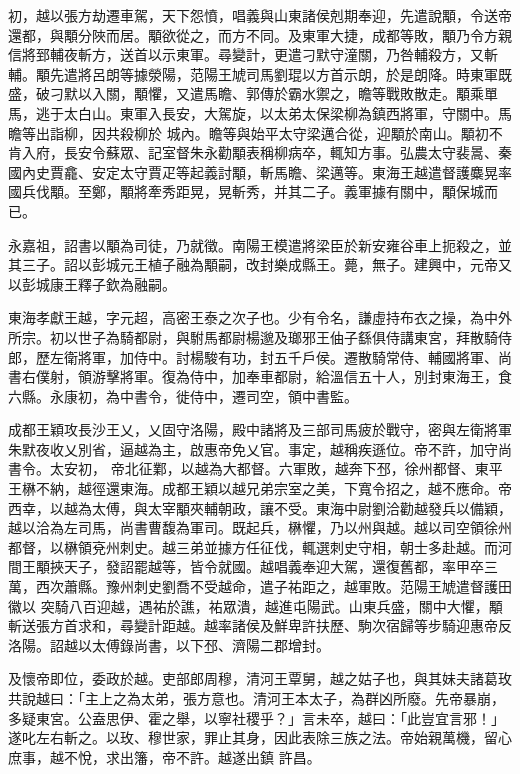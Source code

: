 \begin{pinyinscope}
 初，越以張方劫遷車駕，天下怨憤，唱義與山東諸侯剋期奉迎，先遣說顒，令送帝還都，與顒分陜而居。顒欲從之，而方不同。及東軍大捷，成都等敗，顒乃令方親信將郅輔夜斬方，送首以示東軍。尋變計，更遣刁默守潼關，乃咎輔殺方，又斬輔。顒先遣將呂朗等據滎陽，范陽王虓司馬劉琨以方首示朗，於是朗降。時東軍既盛，破刁默以入關，顒懼，又遣馬瞻、郭傳於霸水禦之，瞻等戰敗散走。顒乘單馬，逃于太白山。東軍入長安，大駕旋，以太弟太保梁柳為鎮西將軍，守關中。馬瞻等出詣柳，因共殺柳於
 城內。瞻等與始平太守梁邁合從，迎顒於南山。顒初不肯入府，長安令蘇眾、記室督朱永勸顒表稱柳病卒，輒知方事。弘農太守裴暠、秦國內史賈龕、安定太守賈疋等起義討顒，斬馬瞻、梁邁等。東海王越遣督護麋晃率國兵伐顒。至鄭，顒將牽秀距晃，晃斬秀，并其二子。義軍據有關中，顒保城而已。



 永嘉祖，詔書以顒為司徒，乃就徵。南陽王模遣將梁臣於新安雍谷車上扼殺之，並其三子。詔以彭城元王植子融為顒嗣，改封樂成縣王。薨，無子。建興中，元帝又以彭城康王釋子欽為融嗣。



 東海孝獻王越，字元超，高密王泰之次子也。少有令名，謙虛持布衣之操，為中外所宗。初以世子為騎都尉，與駙馬都尉楊邈及瑯邪王伷子繇俱侍講東宮，拜散騎侍郎，歷左衛將軍，加侍中。討楊駿有功，封五千戶侯。遷散騎常侍、輔國將軍、尚書右僕射，領游擊將軍。復為侍中，加奉車都尉，給溫信五十人，別封東海王，食六縣。永康初，為中書令，徙侍中，遷司空，領中書監。



 成都王穎攻長沙王乂，乂固守洛陽，殿中諸將及三部司馬疲於戰守，密與左衛將軍朱默夜收乂別省，逼越為主，啟惠帝免乂官。事定，越稱疾遜位。帝不許，加守尚書令。太安初，
 帝北征鄴，以越為大都督。六軍敗，越奔下邳，徐州都督、東平王楙不納，越徑還東海。成都王穎以越兄弟宗室之美，下寬令招之，越不應命。帝西幸，以越為太傅，與太宰顒夾輔朝政，讓不受。東海中尉劉洽勸越發兵以備穎，越以洽為左司馬，尚書曹馥為軍司。既起兵，楙懼，乃以州與越。越以司空領徐州都督，以楙領兗州刺史。越三弟並據方任征伐，輒選刺史守相，朝士多赴越。而河間王顒挾天子，發詔罷越等，皆令就國。越唱義奉迎大駕，還復舊都，率甲卒三萬，西次蕭縣。豫州刺史劉喬不受越命，遣子祐距之，越軍敗。范陽王虓遣督護田徽以
 突騎八百迎越，遇祐於譙，祐眾潰，越進屯陽武。山東兵盛，關中大懼，顒斬送張方首求和，尋變計距越。越率諸侯及鮮卑許扶歷、駒次宿歸等步騎迎惠帝反洛陽。詔越以太傅錄尚書，以下邳、濟陽二郡增封。



 及懷帝即位，委政於越。吏部郎周穆，清河王覃舅，越之姑子也，與其妹夫諸葛玫共說越曰：「主上之為太弟，張方意也。清河王本太子，為群凶所廢。先帝暴崩，多疑東宮。公盍思伊、霍之舉，以寧社稷乎？」言未卒，越曰：「此豈宜言邪！」遂叱左右斬之。以玫、穆世家，罪止其身，因此表除三族之法。帝始親萬機，留心庶事，越不悅，求出籓，帝不許。越遂出鎮
 許昌。




\end{pinyinscope}
